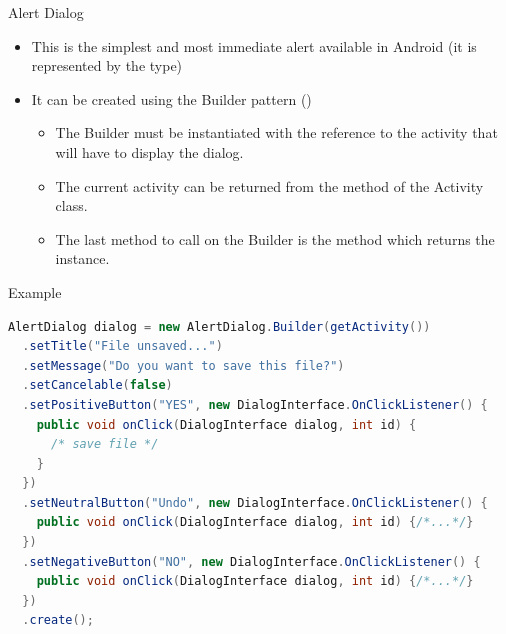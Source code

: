 \documentclass{beamer}
\begin{document}
  \begin{frame}{Alert Dialog}
      \begin{itemize}\itemsep10pt
        \item This is the simplest and most immediate alert available in Android
        (it is represented by the  type)
        \item It can be created using the Builder pattern () 
        \begin{itemize}
        \item The Builder must be instantiated with the reference to the activity
        that will have to display the dialog.
        \item The current activity can be returned from the 
        method of the Activity class. 
        \item The last method to call on the Builder is the 
        method which returns the  instance.
      \end{itemize}
    \end{itemize}

    \begin{exampleblock}{Example}
      \begin{lstlisting}[language=Java]  	
AlertDialog dialog = new AlertDialog.Builder(getActivity())
  .setTitle("File unsaved...")
  .setMessage("Do you want to save this file?")
  .setCancelable(false)
  .setPositiveButton("YES", new DialogInterface.OnClickListener() {
    public void onClick(DialogInterface dialog, int id) { 
      /* save file */ 
    }
  })
  .setNeutralButton("Undo", new DialogInterface.OnClickListener() {
    public void onClick(DialogInterface dialog, int id) {/*...*/}
  })
  .setNegativeButton("NO", new DialogInterface.OnClickListener() {
    public void onClick(DialogInterface dialog, int id) {/*...*/}
  })
  .create();
      \end{lstlisting}
    \end{exampleblock}
  \end{frame}
\end{document}
